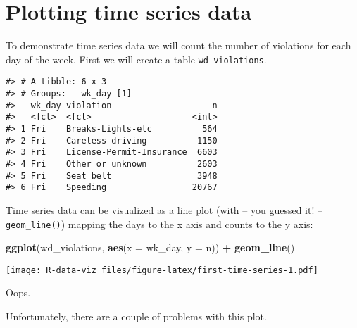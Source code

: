 \documentclass[]{book}
\newenvironment{Shaded}{\begin{snugshade}}{\end{snugshade}}
\newcommand{\KeywordTok}[1]{\textcolor[rgb]{0.13,0.29,0.53}{\textbf{#1}}}
\newcommand{\DataTypeTok}[1]{\textcolor[rgb]{0.13,0.29,0.53}{#1}}
\newcommand{\StringTok}[1]{\textcolor[rgb]{0.31,0.60,0.02}{#1}}
\newcommand{\CommentTok}[1]{\textcolor[rgb]{0.56,0.35,0.01}{\textit{#1}}}
\newcommand{\OperatorTok}[1]{\textcolor[rgb]{0.81,0.36,0.00}{\textbf{#1}}}
\newcommand{\NormalTok}[1]{#1}
\theoremstyle{definition}
\theoremstyle{definition}
\theoremstyle{definition}
\theoremstyle{remark}
\begin{document}
\section{Plotting time series data}\label{plotting-time-series-data}

To demonstrate time series data we will count the number of violations
for each day of the week. First we will create a table
\texttt{wd\_violations}.

\begin{Shaded}
\end{Shaded}

\begin{verbatim}
#> # A tibble: 6 x 3
#> # Groups:   wk_day [1]
#>   wk_day violation                    n
#>   <fct>  <fct>                    <int>
#> 1 Fri    Breaks-Lights-etc          564
#> 2 Fri    Careless driving          1150
#> 3 Fri    License-Permit-Insurance  6603
#> 4 Fri    Other or unknown          2603
#> 5 Fri    Seat belt                 3948
#> 6 Fri    Speeding                 20767
\end{verbatim}

Time series data can be visualized as a line plot (with -- you guessed
it! -- \texttt{geom\_line()}) mapping the days to the x axis and counts
to the y axis:

\begin{Shaded}
\begin{Highlighting}[]
\KeywordTok{ggplot}\NormalTok{(wd_violations, }\KeywordTok{aes}\NormalTok{(}\DataTypeTok{x =}\NormalTok{ wk_day, }\DataTypeTok{y =}\NormalTok{ n)) }\OperatorTok{+}
\StringTok{  }\KeywordTok{geom_line}\NormalTok{()}
\end{Highlighting}
\end{Shaded}

\texttt{[image: R-data-viz\_files/figure-latex/first-time-series-1.pdf]}

Oops.

Unfortunately, there are a couple of problems with this plot.
\end{document}
